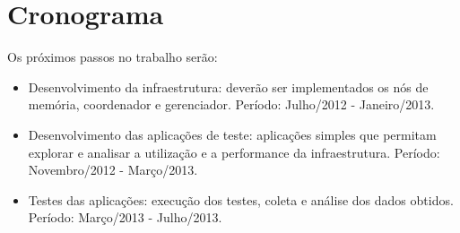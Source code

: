 \documentclass[11pt,twoside,a4paper]{book}
\renewcommand{\chaptermark}[1]{\markboth{\MakeUppercase{#1}}{}}
\begin{document}
\chapter{Cronograma}
\label{chap:cronograma}
Os próximos passos no trabalho serão:

\begin{itemize}
\item Desenvolvimento da infraestrutura: deverão ser implementados os nós de memória, coordenador e gerenciador. Período: Julho/2012 - Janeiro/2013.
\item Desenvolvimento das aplicações de teste: aplicações simples que permitam explorar e analisar a utilização e a performance da infraestrutura. Período: Novembro/2012 - Março/2013.
\item Testes das aplicações: execução dos testes, coleta e análise dos dados obtidos. Período: Março/2013 - Julho/2013.
\end{itemize}

\renewcommand{\chaptermark}[1]{\markboth{\MakeUppercase{\appendixname\ \thechapter}} {\MakeUppercase{#1}} }
\fancyhead[RE,LO]{}
\appendix

\backmatter \singlespacing   %
\end{document}
